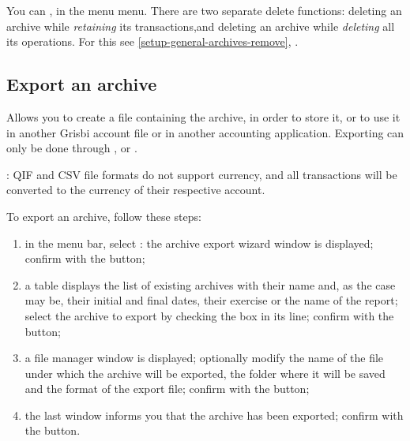 You can  , in the menu  menu. There are two separate delete functions: deleting an archive while  \emph{retaining} its transactions,and deleting an archive while  \emph{deleting}  all its operations. For this see \vref{setup-general-archives-remove}, . 


\subsection{Export an archive\label{datamanagement-history-export}}

Allows you to create a file containing the archive, in order to store it, or to use it in another Grisbi account file or in another accounting application. Exporting can only be done through ,  or .

: QIF and CSV file formats do not support currency, and all transactions will be converted to the currency of their respective account.



To export an archive, follow these steps:

\begin{enumerate}
	\item in the menu bar, select  : the archive export wizard window is displayed; confirm with the  button;
	\item a table displays the list of existing archives with their name and, as the case may be, their initial and final dates, their exercise or the name of the report; select the archive to export by checking the box in its line; confirm with the  button;
	\item a file manager window is displayed; optionally modify the name of the file under which the archive will be exported, the folder where it will be saved and the format of the export file; confirm with the  button;
	\item the last window informs you that the archive has been exported; confirm with the  button.
\end{enumerate}










